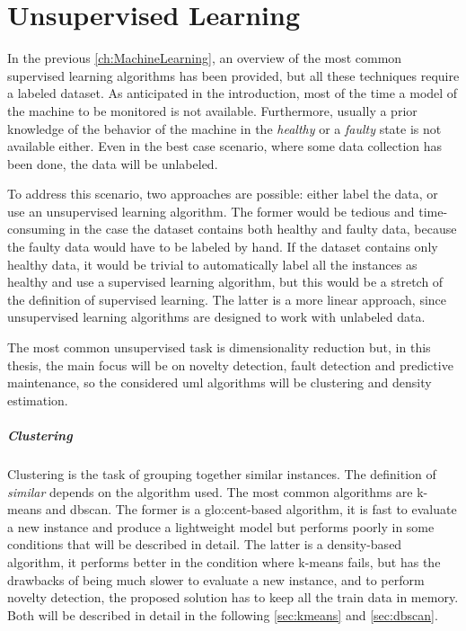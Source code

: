 \chapter{Unsupervised Learning}
\label{ch:Unsupervised}

In the previous \autoref{ch:MachineLearning}, an overview of the most common supervised learning algorithms has been provided, but all these techniques require a labeled dataset. As anticipated in the introduction, most of the time a model of the machine to be monitored is not available. Furthermore, usually a prior knowledge of the behavior of the machine in the \emph{healthy} or a \emph{faulty} state is not available either. Even in the best case scenario, where some data collection has been done, the data will be unlabeled. 

To address this scenario, two approaches are possible: either label the data, or use an unsupervised learning algorithm. The former would be tedious and time-consuming in the case the dataset contains both healthy and faulty data, because the faulty data would have to be labeled by hand. If the dataset contains only healthy data, it would be trivial to automatically label all the instances as healthy and use a supervised learning algorithm, but this would be a stretch of the definition of supervised learning. The latter is a more linear approach, since unsupervised learning algorithms are designed to work with unlabeled data.

The most common unsupervised task is dimensionality reduction  but, in this thesis, the main focus will be on novelty detection, fault detection and predictive maintenance, so the considered \gls{uml} algorithms will be clustering and density estimation.

\paragraph[]{Clustering}
Clustering is the task of grouping together similar instances. The definition of \emph{similar} depends on the algorithm used. The most common algorithms are {k-means} and \gls{dbscan}. The former is a \gls{glo:cent}-based algorithm, it is fast to evaluate a new instance and produce a lightweight model but performs poorly in some conditions that will be described in detail. The latter is a density-based algorithm, it performs better in the condition where k-means fails, but has the drawbacks of being much slower to evaluate a new instance, and to perform novelty detection, the proposed solution has to keep all the train data in memory. Both will be described in detail in the following \autoref{sec:kmeans} and \autoref{sec:dbscan}.

